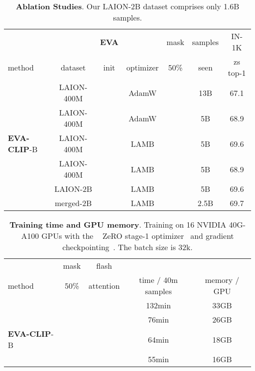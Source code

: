 \documentclass[10pt,twocolumn,letterpaper]{article}
\newcommand{\tablestyle}[2]{\setlength{\tabcolsep}{#1}\renewcommand{\arraystretch}{#2}\centering\footnotesize}
\newcommand{\evapurple}[1]{\textcolor{eva01purple}{#1}}
\newcommand{\evablue}[1]{\textcolor{00blue!80}{#1}}
\newcommand{\evaone}{{\textbf{\evapurple{EVA}}}\xspace}
\newcommand{\evaclip}{{\textbf{\evablue{EVA-CLIP}}}\xspace}
\newcommand{\cmark}{\ding{51}}\newcommand{\xmark}{\ding{55}}
\begin{document}
\begin{table}[!t]
\centering
    \tablestyle{2pt}{1.2}
    \scriptsize
    \begin{tabular}{l|ccccc|c}
        &   & \evaone &  & mask & samples & {\scriptsize{IN-1K}} \\ 
        method & dataset & init & optimizer &  50\%  & seen & zs top-1 \\
        \shline

         & {\scriptsize{LAION-400M}} & \xmark & AdamW & \xmark & 13B & 67.1 \\
         & \scriptsize{LAION-400M} & \cmark & AdamW & \xmark & 5B & 68.9 \\
        \evaclip-B & \scriptsize{LAION-400M} & \cmark & LAMB & \xmark & 5B & 69.6 \\
         & \scriptsize{LAION-400M} & \cmark & LAMB & \cmark & 5B & 68.9 \\
         & \scriptsize{LAION-2B} & \cmark & LAMB & \cmark & 5B & 69.6 \\
         & \scriptsize{merged-2B} & \cmark & LAMB & \cmark & 2.5B & 69.7 \\

    \end{tabular}
    \vspace{-.5em}
    \caption{\textbf{Ablation Studies}. Our LAION-2B dataset comprises only 1.6B samples.}
\label{tab: ablation}
\end{table}



\begin{table}[!t]
\centering
    \tablestyle{2pt}{1.2}
    \scriptsize
    \begin{tabular}{l|c|c|c|c}
        & mask & flash  \\ 
        method & 50\% & attention & time / 40m samples &  memory / GPU \\
        \shline
        & \xmark & \xmark & 132min & 33GB \\
        & \xmark & \cmark & 76min & 26GB \\
        \evaclip-B & \cmark & \xmark & 64min & 18GB \\
        & \cmark & \cmark & 55min & 16GB \\
    \end{tabular}
    \vspace{-.5em}
    \caption{\textbf{Training time and GPU memory}. Training on 16 NVIDIA 40G-A100 GPUs with the  ~\cite{rasley2020deepspeed} ZeRO stage-1 optimizer~\cite{rajbhandari2020zero} and gradient checkpointing~\cite{gradcheckpointing}. The batch size is 32k.}
\label{tab: computation cost}
\end{table}
\end{document}
